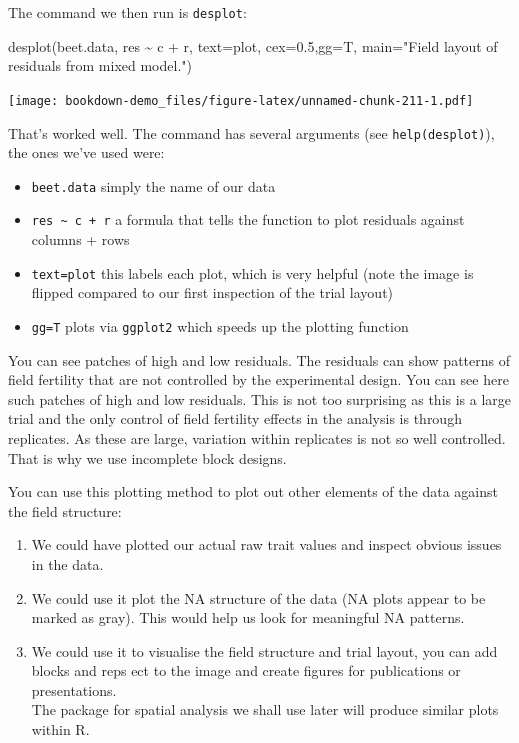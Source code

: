 \documentclass[
]{book}
\newenvironment{Shaded}{\begin{snugshade}}{\end{snugshade}}
\newcommand{\AttributeTok}[1]{\textcolor[rgb]{0.77,0.63,0.00}{#1}}
\newcommand{\FloatTok}[1]{\textcolor[rgb]{0.00,0.00,0.81}{#1}}
\newcommand{\FunctionTok}[1]{\textcolor[rgb]{0.00,0.00,0.00}{#1}}
\newcommand{\NormalTok}[1]{#1}
\newcommand{\SpecialCharTok}[1]{\textcolor[rgb]{0.00,0.00,0.00}{#1}}
\newcommand{\StringTok}[1]{\textcolor[rgb]{0.31,0.60,0.02}{#1}}
\providecommand{\tightlist}{%
  \setlength{\itemsep}{0pt}\setlength{\parskip}{0pt}}
\begin{document}
The command we then run is \texttt{desplot}:

\begin{Shaded}
\begin{Highlighting}[]
\FunctionTok{desplot}\NormalTok{(beet.data, res }\SpecialCharTok{\textasciitilde{}}\NormalTok{ c }\SpecialCharTok{+}\NormalTok{ r, }\AttributeTok{text=}\NormalTok{plot, }\AttributeTok{cex=}\FloatTok{0.5}\NormalTok{,}\AttributeTok{gg=}\NormalTok{T,}
        \AttributeTok{main=}\StringTok{"Field layout of residuals from mixed model."}\NormalTok{)}
\end{Highlighting}
\end{Shaded}

\texttt{[image: bookdown-demo\_files/figure-latex/unnamed-chunk-211-1.pdf]}

That's worked well. The command has several arguments (see \texttt{help(desplot)}), the ones we've used were:

\begin{itemize}
\tightlist
\item
  \texttt{beet.data} simply the name of our data
\item
  \texttt{res\ \textasciitilde{}\ c\ +\ r} a formula that tells the function to plot residuals against columns + rows
\item
  \texttt{text=plot} this labels each plot, which is very helpful (note the image is flipped compared to our first inspection of the trial layout)
\item
  \texttt{gg=T} plots via \texttt{ggplot2} which speeds up the plotting function
\end{itemize}

You can see patches of high and low residuals. The residuals can show patterns of field fertility that are not controlled by the experimental design. You can see here such patches of high and low residuals. This is not too surprising as this is a large trial and the only control of field fertility effects in the analysis is through replicates. As these are large, variation within replicates is not so well controlled. That is why we use incomplete block designs.

You can use this plotting method to plot out other elements of the data against the field structure:

\begin{enumerate}
\def\labelenumi{\arabic{enumi}.}
\tightlist
\item
  We could have plotted our actual raw trait values and inspect obvious issues in the data.
\item
  We could use it plot the NA structure of the data (NA plots appear to be marked as gray). This would help us look for meaningful NA patterns.
\item
  We could use it to visualise the field structure and trial layout, you can add blocks and reps ect to the image and create figures for publications or presentations.\\
  The package for spatial analysis we shall use later will produce similar plots within R.
\end{enumerate}
\end{document}
